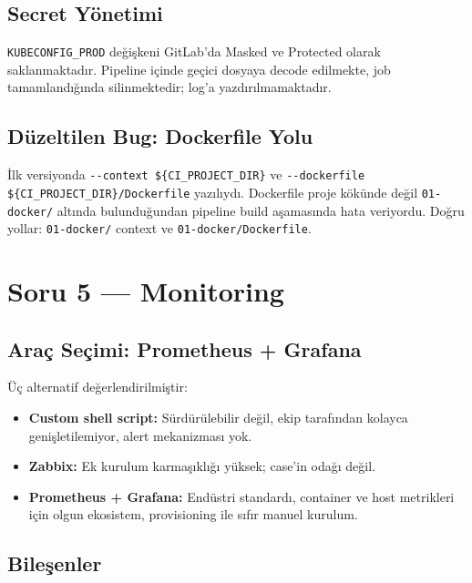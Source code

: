 \documentclass[12pt,a4paper]{article}
\begin{document}
\subsection{Secret Yönetimi}

\texttt{KUBECONFIG\_PROD} değişkeni GitLab'da Masked ve Protected
olarak saklanmaktadır. Pipeline içinde geçici dosyaya decode
edilmekte, job tamamlandığında silinmektedir; log'a yazdırılmamaktadır.

\subsection{Düzeltilen Bug: Dockerfile Yolu}

İlk versiyonda \texttt{-{}-context \$\{CI\_PROJECT\_DIR\}} ve
\texttt{-{}-dockerfile \$\{CI\_PROJECT\_DIR\}/Dockerfile} yazılıydı.
Dockerfile proje kökünde değil \texttt{01-docker/} altında
bulunduğundan pipeline build aşamasında hata veriyordu.
Doğru yollar: \texttt{01-docker/} context ve
\texttt{01-docker/Dockerfile}.

\section{Soru 5 — Monitoring}

\subsection{Araç Seçimi: Prometheus + Grafana}

Üç alternatif değerlendirilmiştir:

\begin{itemize}[leftmargin=*]
  \item \textbf{Custom shell script:} Sürdürülebilir değil, ekip
        tarafından kolayca genişletilemiyor, alert mekanizması yok.
  \item \textbf{Zabbix:} Ek kurulum karmaşıklığı yüksek; case'in
        odağı değil.
  \item \textbf{Prometheus + Grafana:} Endüstri standardı, container
        ve host metrikleri için olgun ekosistem, provisioning ile
        sıfır manuel kurulum.
\end{itemize}

\subsection{Bileşenler}
\end{document}
